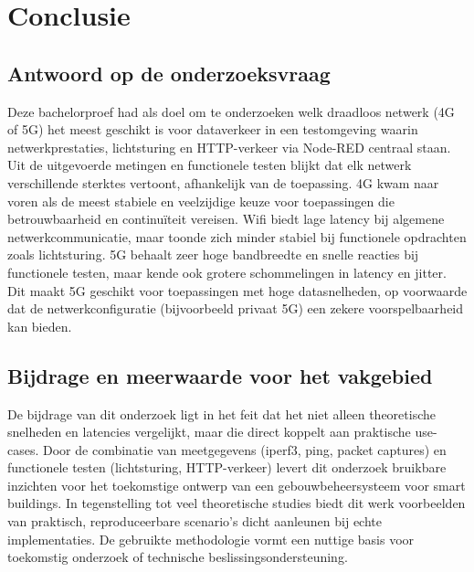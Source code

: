 
\chapter{Conclusie}%
\label{ch:conclusie}




\section{Antwoord op de onderzoeksvraag}
Deze bachelorproef had als doel om te onderzoeken welk draadloos netwerk (4G of 5G) het meest geschikt is voor dataverkeer in een testomgeving waarin netwerkprestaties, lichtsturing en HTTP-verkeer via Node-RED centraal staan. Uit de uitgevoerde metingen en functionele testen blijkt dat elk netwerk verschillende sterktes vertoont, afhankelijk van de toepassing.
4G kwam naar voren als de meest stabiele en veelzijdige keuze voor toepassingen die betrouwbaarheid en continuïteit vereisen. Wifi biedt lage latency bij algemene netwerkcommunicatie, maar toonde zich minder stabiel bij functionele opdrachten zoals lichtsturing. 5G behaalt zeer hoge bandbreedte en snelle reacties bij functionele testen, maar kende ook grotere schommelingen in latency en jitter. Dit maakt 5G geschikt voor toepassingen met hoge datasnelheden, op voorwaarde dat de netwerkconfiguratie (bijvoorbeeld privaat 5G) een zekere voorspelbaarheid kan bieden.


\section{Bijdrage en meerwaarde voor het vakgebied}
De bijdrage van dit onderzoek ligt in het feit dat het niet alleen theoretische snelheden en latencies vergelijkt, maar die direct koppelt aan praktische use-cases. Door de combinatie van meetgegevens (iperf3, ping, packet captures) en functionele testen (lichtsturing, HTTP-verkeer) levert dit onderzoek bruikbare inzichten voor het toekomstige ontwerp van een gebouwbeheersysteem voor smart buildings.
In tegenstelling tot veel theoretische studies biedt dit werk voorbeelden van  praktisch, reproduceerbare scenario’s dicht aanleunen bij echte implementaties. De gebruikte methodologie vormt een nuttige basis voor toekomstig onderzoek of technische beslissingsondersteuning.


